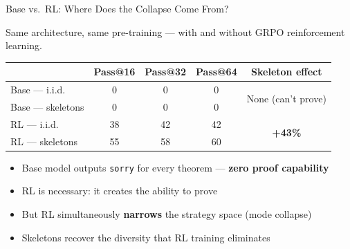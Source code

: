 \documentclass[aspectratio=169]{beamer}
\begin{document}
\begin{frame}{Base vs.\ RL: Where Does the Collapse Come From?}

Same architecture, same pre-training --- with and without GRPO reinforcement learning.

\vspace{0.5em}
\begin{table}
\centering
\begin{tabular}{lcccc}
\toprule
& \textbf{Pass@16} & \textbf{Pass@32} & \textbf{Pass@64} & \textbf{Skeleton effect} \\
\midrule
Base --- i.i.d. & 0 & 0 & 0 & \multirow{2}{*}{None (can't prove)} \\
Base --- skeletons & 0 & 0 & 0 & \\
\midrule
RL --- i.i.d. & 38 & 42 & 42 & \multirow{2}{*}{\textbf{+43\%}} \\
RL --- skeletons & 55 & 58 & 60 & \\
\bottomrule
\end{tabular}
\end{table}

\vspace{0.5em}
\begin{itemize}
    \item Base model outputs \texttt{sorry} for every theorem --- \textbf{zero proof capability}
    \item RL is necessary: it creates the ability to prove
    \item But RL simultaneously \textbf{narrows} the strategy space (mode collapse)
    \item Skeletons recover the diversity that RL training eliminates
\end{itemize}
\end{frame}
\end{document}
